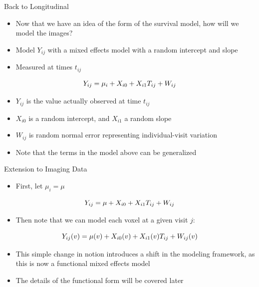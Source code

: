 \documentclass[
  ignorenonframetext,
]{beamer}
\providecommand{\tightlist}{%
  \setlength{\itemsep}{0pt}\setlength{\parskip}{0pt}}
\begin{document}
\begin{frame}{Back to Longitudinal}
\protect\hypertarget{back-to-longitudinal}{}
\begin{itemize}
\tightlist
\item
  Now that we have an idea of the form of the survival model, how will
  we model the images?
\item
  Model \(Y_{ij}\) with a mixed effects model with a random intercept
  and slope
\item
  Measured at times \(t_{ij}\)
\end{itemize}

\[
Y_{ij} = \mu_i + X_{i0} + X_{i1}T_{ij} + W_{ij} \\
\]

\begin{itemize}
\tightlist
\item
  \(Y_{ij}\) is the value actually observed at time \(t_{ij}\)
\item
  \(X_{i0}\) is a random intercept, and \(X_{i1}\) a random slope
\item
  \(W_{ij}\) is random normal error representing individual-visit
  variation
\item
  Note that the terms in the model above can be generalized
\end{itemize}
\end{frame}

\begin{frame}{Extension to Imaging Data}
\protect\hypertarget{extension-to-imaging-data}{}
\begin{itemize}
\tightlist
\item
  First, let \(\mu_i = \mu\)
\end{itemize}

\[
Y_{ij} = \mu + X_{i0} + X_{i1}T_{ij} + W_{ij} \\
\]

\begin{itemize}
\tightlist
\item
  Then note that we can model each voxel at a given visit \(j\):
\end{itemize}

\[
Y_{ij}(v) = \mu(v) + X_{i0}(v) + X_{i1}(v)T_{ij} + W_{ij}(v) \\
\]

\begin{itemize}
\item
  This simple change in notion introduces a shift in the modeling
  framework, as this is now a functional mixed effects model
\item
  The details of the functional form will be covered later
\end{itemize}
\end{frame}
\end{document}
